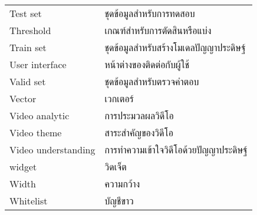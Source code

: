 \begin{abbreviations}
\begin{tabular*}{\textwidth}{@{}p{}p{}@{}}
	Test set & ชุดข้อมูลสำหรับการทดสอบ\\
        Threshold & เกณฑ์สำหรับการตัดสินหรือแบ่ง\\
	Train set & ชุดข้อมูลสำหรับสร้างโมเดลปัญญาประดิษฐ์\\
	User interface & หน้าต่างของติดต่อกับผู้ใช้\\
	Valid set & ชุดข้อมูลสำหรับตรวจคำตอบ\\
	Vector & เวกเตอร์\\
	Video analytic & การประมวลผลวิดีโอ\\
	Video theme & สาระสำคัญของวิดีโอ\\
	Video understanding & การทำความเข้าใจวิดีโอด้วยปัญญาประดิษฐ์\\
	widget & วิดเจ็ต \\
	Width & ความกว้าง\\
	Whitelist & บัญชีขาว\\
    \end{tabular*}
\end{abbreviations}